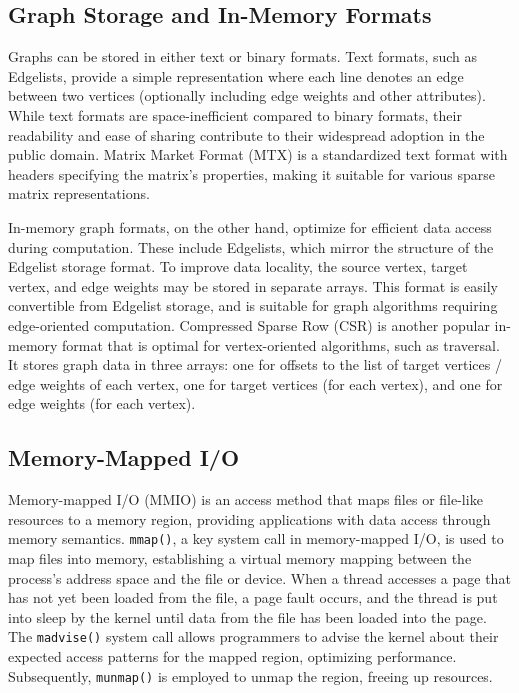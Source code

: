 \subsection{Graph Storage and In-Memory Formats}

Graphs can be stored in either text or binary formats. Text formats, such as Edgelists, provide a simple representation where each line denotes an edge between two vertices (optionally including edge weights and other attributes). While text formats are space-inefficient compared to binary formats, their readability and ease of sharing contribute to their widespread adoption in the public domain. Matrix Market Format (MTX) is a standardized text format with headers specifying the matrix's properties, making it suitable for various sparse matrix representations.

In-memory graph formats, on the other hand, optimize for efficient data access during computation. These include Edgelists, which mirror the structure of the Edgelist storage format. To improve data locality, the source vertex, target vertex, and edge weights may be stored in separate arrays. This format is easily convertible from Edgelist storage, and is suitable for graph algorithms requiring edge-oriented computation. Compressed Sparse Row (CSR) is another popular in-memory format that is optimal for vertex-oriented algorithms, such as traversal. It stores graph data in three arrays: one for offsets to the list of target vertices / edge weights of each vertex, one for target vertices (for each vertex), and one for edge weights (for each vertex).




\subsection{Memory-Mapped I/O}

Memory-mapped I/O (MMIO) is an access method that maps files or file-like resources to a memory region, providing applications with data access through memory semantics. \texttt{mmap()}, a key system call in memory-mapped I/O, is used to map files into memory, establishing a virtual memory mapping between the process's address space and the file or device. When a thread accesses a page that has not yet been loaded from the file, a page fault occurs, and the thread is put into sleep by the kernel until data from the file has been loaded into the page. The \texttt{madvise()} system call allows programmers to advise the kernel about their expected access patterns for the mapped region, optimizing performance. Subsequently, \texttt{munmap()} is employed to unmap the region, freeing up resources.

